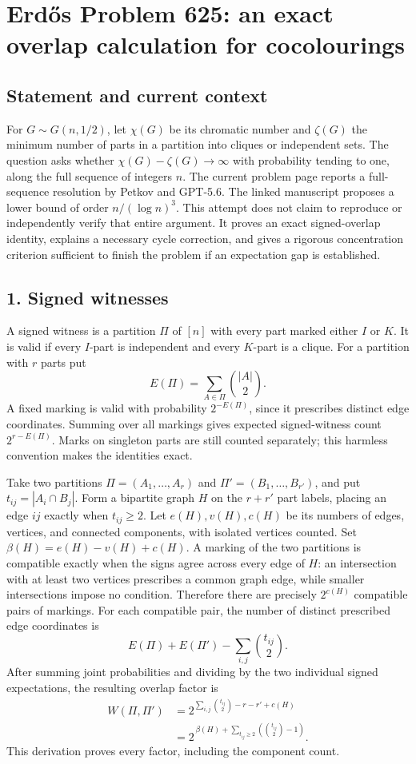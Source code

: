 \section{Erd\H{o}s Problem 625: an exact overlap calculation for cocolourings}
\subsection*{Statement and current context}
For $G\sim G(n,1/2)$, let $\chi(G)$ be its chromatic number and $\zeta(G)$ the minimum number of parts in a partition into cliques or independent sets. The question asks whether $\chi(G)-\zeta(G)\to\infty$ with probability tending to one, along the full sequence of integers $n$.
The current problem page reports a full-sequence resolution by Petkov and GPT-5.6. The linked manuscript proposes a lower bound of order $n/(\log n)^3$. This attempt does not claim to reproduce or independently verify that entire argument. It proves an exact signed-overlap identity, explains a necessary cycle correction, and gives a rigorous concentration criterion sufficient to finish the problem if an expectation gap is established.

\subsection*{1. Signed witnesses}
A signed witness is a partition $\Pi$ of $[n]$ with every part marked either $I$ or $K$. It is valid if every $I$-part is independent and every $K$-part is a clique. For a partition with $r$ parts put
\[
 E(\Pi)=\sum_{A\in\Pi}\binom{|A|}{2}.
\]
A fixed marking is valid with probability $2^{-E(\Pi)}$, since it prescribes distinct edge coordinates. Summing over all markings gives expected signed-witness count $2^{r-E(\Pi)}$. Marks on singleton parts are still counted separately; this harmless convention makes the identities exact.

Take two partitions $\Pi=(A_1,\ldots,A_r)$ and $\Pi'=(B_1,\ldots,B_{r'})$, and put $t_{ij}=|A_i\cap B_j|$. Form a bipartite graph $H$ on the $r+r'$ part labels, placing an edge $ij$ exactly when $t_{ij}\ge2$. Let $e(H),v(H),c(H)$ be its numbers of edges, vertices, and connected components, with isolated vertices counted. Set $\beta(H)=e(H)-v(H)+c(H)$.
A marking of the two partitions is compatible exactly when the signs agree across every edge of $H$: an intersection with at least two vertices prescribes a common graph edge, while smaller intersections impose no condition. Therefore there are precisely $2^{c(H)}$ compatible pairs of markings. For each compatible pair, the number of distinct prescribed edge coordinates is
\[
 E(\Pi)+E(\Pi')-\sum_{i,j}\binom{t_{ij}}2.
\]
After summing joint probabilities and dividing by the two individual signed expectations, the resulting overlap factor is
\begin{align*}
 W(\Pi,\Pi')
 &=2^{\sum_{i,j}\binom{t_{ij}}2-r-r'+c(H)}\\
 &=\boxed{2^{\,\beta(H)+\sum_{t_{ij}\ge2}(\binom{t_{ij}}2-1)}}.
 \tag{1}
\end{align*}
This derivation proves every factor, including the component count.

